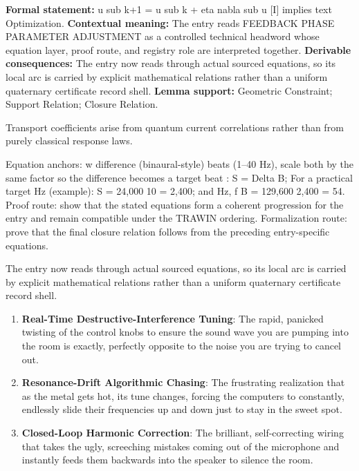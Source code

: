 \begingroup\footnotesize\setlength{\emergencystretch}{3em}\sloppy
\textbf{Formal statement:} u sub k+1 = u sub k + eta nabla sub u [I] implies text Optimization. \textbf{Contextual meaning:} The entry reads FEEDBACK PHASE PARAMETER ADJUSTMENT as a controlled technical headword whose equation layer, proof route, and registry role are interpreted together. \textbf{Derivable consequences:} The entry now reads through actual sourced equations, so its local arc is carried by explicit mathematical relations rather than a uniform quaternary certificate record shell. \textbf{Lemma support:} Geometric Constraint; Support Relation; Closure Relation.\par
\endgroup

Transport coefficients arise from quantum current correlations rather than from purely classical response laws.

Equation anchors: w difference (binaural-style) beats (1--40 Hz), scale both by the same factor so the difference becomes a target beat : S = Delta B; For a practical target Hz (example): S = 24,000 10 = 2,400; and Hz, f  B = 129,600 2,400 = 54. Proof route: show that the stated equations form a coherent progression for the entry and remain compatible under the TRAWIN ordering. Formalization route: prove that the final closure relation follows from the preceding entry-specific equations.

The entry now reads through actual sourced equations, so its local arc is carried by explicit mathematical relations rather than a uniform quaternary certificate record shell.
\endgroup

\begin{enumerate}[leftmargin=1.6em,itemsep=6pt,topsep=4pt]
\item \textbf{Real-Time Destructive-Interference Tuning}: The rapid, panicked twisting of the control knobs to ensure the sound wave you are pumping into the room is exactly, perfectly opposite to the noise you are trying to cancel out.
\item \textbf{Resonance-Drift Algorithmic Chasing}: The frustrating realization that as the metal gets hot, its tune changes, forcing the computers to constantly, endlessly slide their frequencies up and down just to stay in the sweet spot.
\item \textbf{Closed-Loop Harmonic Correction}: The brilliant, self-correcting wiring that takes the ugly, screeching mistakes coming out of the microphone and instantly feeds them backwards into the speaker to silence the room.
\end{enumerate}

